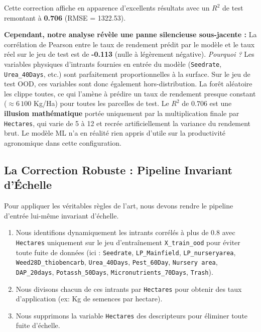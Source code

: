 \documentclass[11pt,a4paper]{article}
\begin{document}
Cette correction affiche en apparence d'excellents résultats avec un $R^2$ de test remontant à \textbf{0.706} (RMSE = 1322.53).

\textbf{Cependant, notre analyse révèle une panne silencieuse sous-jacente :}
La corrélation de Pearson entre le taux de rendement prédit par le modèle et le taux réel sur le jeu de test est de \textbf{-0.113} (nulle à légèrement négative).
\textit{Pourquoi ?} Les variables physiques d'intrants fournies en entrée du modèle (\texttt{Seedrate}, \texttt{Urea\_40Days}, etc.) sont parfaitement proportionnelles à la surface. Sur le jeu de test OOD, ces variables sont donc également hors-distribution. La forêt aléatoire les clippe toutes, ce qui l'amène à prédire un taux de rendement presque constant ($\approx 6\,100$ Kg/Ha) pour toutes les parcelles de test.
Le $R^2$ de $0.706$ est une \textbf{illusion mathématique} portée uniquement par la multiplication finale par \texttt{Hectares}, qui varie de 5 à 12 et recrée artificiellement la variance du rendement brut. Le modèle ML n'a en réalité rien appris d'utile sur la productivité agronomique dans cette configuration.

\subsection{La Correction Robuste : Pipeline Invariant d'Échelle}
Pour appliquer les véritables règles de l'art, nous devons rendre le pipeline d'entrée lui-même invariant d'échelle.
\begin{enumerate}
    \item Nous identifions dynamiquement les intrants corrélés à plus de 0.8 avec \texttt{Hectares} uniquement sur le jeu d'entraînement \texttt{X\_train\_ood} pour éviter toute fuite de données (ici : \texttt{Seedrate}, \texttt{LP\_Mainfield}, \texttt{LP\_nurseryarea}, \texttt{Weed28D\_thiobencarb}, \texttt{Urea\_40Days}, \texttt{Pest\_60Day}, \texttt{Nursery area}, \texttt{DAP\_20days}, \texttt{Potassh\_50Days}, \texttt{Micronutrients\_70Days}, \texttt{Trash}).
    \item Nous divisons chacun de ces intrants par \texttt{Hectares} pour obtenir des taux d'application (ex: Kg de semences par hectare).
    \item Nous supprimons la variable \texttt{Hectares} des descripteurs pour éliminer toute fuite d'échelle.
\end{enumerate}
\end{document}
